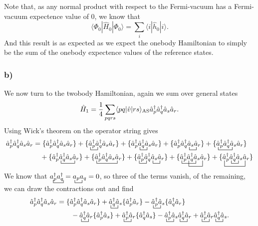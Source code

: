 \documentclass[a4paper, 11pt, notitlepage, english]{article}
\newcommand{\op}[1]{\hat{#1}}
\newcommand{\braopket}[3]{\langle #1 | {#2} | #3 \rangle}
\begin{document}
Note that, as any normal product with respect to the Fermi-vacuum has a Fermi-vacuum expectence value of 0, we know that
$$\braopket{\Phi_0}{\op{H}_0}{\Phi_0} = \sum_i \braopket{i}{\op{h}_0}{i}.$$
And this result is as expected as we expect the onebody Hamiltonian to simply be the sum of the onebody expectence values of the reference states.

\subsubsection*{b)}
We now turn to the twobody Hamiltonian, again we sum over general states
$$\op{H}_1 = \frac{1}{4}\sum_{pqrs} \braopket{pq}{\op{v}}{rs}_{\rm AS} \op{a}_p^\dag \op{a}_q^\dag \op{a}_s\op{a}_r.$$
Using Wick's theorem on the operator string gives
\begin{align*}
\op{a}_p^\dag \op{a}_q^\dag \op{a}_s\op{a}_r &= \{\op{a}_p^\dag \op{a}_q^\dag \op{a}_s\op{a}_r\}
+ \{ 
\bcontraction{}{a}{_p^\dag}{a} 
\op{a}_p^\dag \op{a}_q^\dag \op{a}_s\op{a}_r
\} + \{ 
\bcontraction{a_p^\dag}{a}{_q^\dag}{a} 
\op{a}_p^\dag \op{a}_q^\dag \op{a}_s\op{a}_r
\} + \{ 
\bcontraction{a_p^\dag a_q^\dag}{a}{_s}{a}
\op{a}_p^\dag \op{a}_q^\dag \op{a}_s\op{a}_r
% 
\} + \{ 
% 
\bcontraction{}{a}{_p^\dag a_q^\dag}{a}
\op{a}_p^\dag \op{a}_q^\dag \op{a}_s\op{a}_r
\} \\ &\quad + \{ 
\bcontraction{a_p^\dag}{a}{_q^\dag a_s}{a}
\op{a}_p^\dag \op{a}_q^\dag \op{a}_s\op{a}_r
\} + \{ 
\bcontraction{}{a}{_p^\dag a_q^\dag a_s^\dag}{a}
\op{a}_p^\dag \op{a}_q^\dag \op{a}_s\op{a}_r
\} + \{ 
\bcontraction{}{a}{_p^\dag}{a}
\bcontraction{a_p^\dag a_q^\dag}{a}{_s^\dag}{a}
\op{a}_p^\dag \op{a}_q^\dag \op{a}_s\op{a}_r
\} + \{ 
\bcontraction{}{a}{_p^\dag a_q^\dag}{a} 
\bcontraction[2ex]{a_p^\dag}{a}{_q^\dag a_s}{a} 
\op{a}_p^\dag \op{a}_q^\dag \op{a}_s\op{a}_r
\} + \{ 
\bcontraction[2ex]{}{a}{_p^\dag a_q^\dag a_s}{a} 
\bcontraction[1ex]{a_p^\dag}{a}{_q^\dag }{a} 
\op{a}_p^\dag \op{a}_q^\dag \op{a}_s\op{a}_r
\}
\end{align*}
We know that $\bcontraction{}{a^\dag}{_p}{a^\dag} a^\dag_p a^\dag_q = \bcontraction{}{a}{_p}{a} a_p a_q = 0$, so three of the terms vanish, of the remaining, we can draw the contractions out and find
\begin{align*}
\op{a}_p^\dag \op{a}_q^\dag \op{a}_s\op{a}_r &= \{\op{a}_p^\dag \op{a}_q^\dag \op{a}_s\op{a}_r\}
+  
\bcontraction{}{a}{_q^\dag}{a} \op{a}_q^\dag \op{a}_s 
\{ \op{a}_p^\dag \op{a}_r \}
- 
% 
\bcontraction{}{a}{_p^\dag}{a} \op{a}_p^\dag \op{a}_s 
\{ \op{a}_q^\dag \op{a}_r \} \\
&\qquad -
\bcontraction{}{a}{_q^\dag}{a} \op{a}_q^\dag \op{a}_r 
\{ \op{a}_p^\dag \op{a}_s \}
+
\bcontraction{}{a}{_p^\dag}{a} \op{a}_p^\dag \op{a}_r 
\{ \op{a}_q^\dag \op{a}_s \}
-
\bcontraction{}{a}{_p^\dag}{a} \op{a}_p^\dag \op{a}_s 
\bcontraction{}{a}{_p^\dag}{a} \op{a}_q^\dag \op{a}_r 
+
\bcontraction{}{a}{_p^\dag}{a} \op{a}_p^\dag \op{a}_r 
\bcontraction{}{a}{_p^\dag}{a} \op{a}_q^\dag \op{a}_s.
\end{align*}
\end{document}
